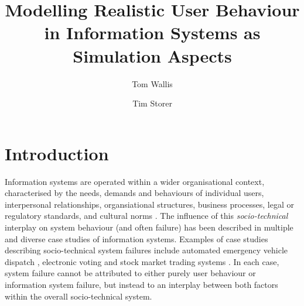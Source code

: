 \documentclass{llncs}
\title{Modelling Realistic User Behaviour in Information Systems as Simulation Aspects}
\author{Tom Wallis\orcidID{} \and Tim Storer\orcidID{}}
\institute{University of Glasgow, Glasgow, Scotland,\\
  \email{twallisgm@gmail.com},\\
  \email{timothy.storer@glasgow.ac.uk},
}
\begin{document}

\maketitle


\begin{abstract}

\end{abstract}


\section{Introduction}
\label{sec:introduction}


Information systems are operated within a wider organisational context, characterised by the needs, demands and
behaviours of individual users, interpersonal relationships, organsiational structures, business processes, legal or
regulatory standards, and cultural norms \citep{susman1976autonomy,bade07structures,pentland05organisational}.  The
influence of this \emph{socio-technical} interplay on system behaviour (and often failure) has been described in
multiple and diverse case studies of information systems.  Examples of case studies describing socio-technical system
failures include automated emergency vehicle dispatch \citep{robinson96limited}, electronic voting
\citep{lock07observations} and stock market trading systems \citet{cftc-sec10findings}. In each case, system failure
cannot be attributed to either purely user behaviour or information system failure, but instead to an interplay between
both factors within the overall socio-technical system.
\end{document}
